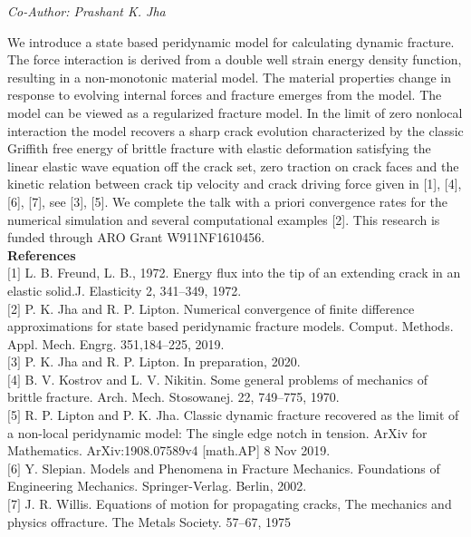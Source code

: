 \begin{center}
\textit{Co-Author: Prashant K. Jha}
\end{center} 
We introduce a state based peridynamic model for calculating dynamic fracture. The force interaction is derived from a double well strain energy density function, resulting in a non-monotonic material model. The material properties change in response to evolving internal forces and fracture emerges from the model. The model can be viewed as a regularized fracture model. In the limit of zero nonlocal interaction the model recovers a sharp crack evolution characterized by the classic Griffith free energy of brittle fracture with elastic deformation satisfying the linear elastic wave equation off the crack set, zero traction on crack faces and the kinetic relation between crack tip velocity and crack driving force given in [1], [4], [6], [7], see [3], [5]. We complete the talk with a priori convergence rates for the numerical simulation and several computational examples [2]. This research is funded through ARO Grant W911NF1610456.\\

\noindent\textbf{References}\\
$[$1$]$ L. B. Freund, L. B., 1972. Energy flux into the tip of an extending crack in an elastic solid.J. Elasticity 2, 341–349, 1972. \\\newline
$[$2$]$ P. K. Jha and R. P. Lipton. Numerical convergence of finite difference approximations for state based peridynamic fracture models. Comput. Methods. Appl. Mech. Engrg. 351,184–225, 2019. \\\newline
$[$3$]$ P. K. Jha and R. P. Lipton. In preparation, 2020.\\\newline
$[$4$]$ B. V. Kostrov and L. V. Nikitin. Some general problems of mechanics of brittle fracture. Arch. Mech. Stosowanej. 22, 749–775, 1970.\\\newline
$[$5$]$ R. P. Lipton and P. K. Jha. Classic dynamic fracture recovered as the limit of a non-local peridynamic model: The single edge notch in tension. ArXiv for Mathematics. ArXiv:1908.07589v4 [math.AP] 8 Nov 2019.\\\newline
$[$6$]$ Y. Slepian. Models and Phenomena in Fracture Mechanics. Foundations of Engineering Mechanics. Springer-Verlag. Berlin, 2002. \\\newline
$[$7$]$ J. R. Willis. Equations of motion for propagating cracks, The mechanics and physics offracture. The Metals Society. 57–67, 1975
